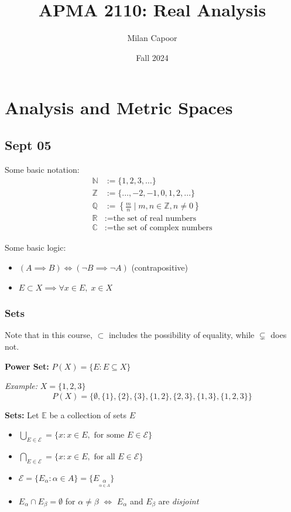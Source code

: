 \documentclass[12pt]{report}
\title{APMA 2110: Real Analysis}
\author{Milan Capoor}
\date{Fall 2024}
\newcommand{\R}{\mathbb{R}}
\newcommand{\E}{\mathbb{E}}
\newcommand{\Z}{\mathbb{Z}}
\newcommand{\N}{\mathbb{N}}
\newcommand{\Q}{\mathbb{Q}}
\newcommand{\C}{\mathbb{C}}
\newcommand{\Ec}{\mathcal{E}}
\newcommand{\sub}{\subseteq}
\begin{document}
\maketitle
\chapter{Analysis and Metric Spaces}
\section{Sept 05}
Some basic notation:
\begin{align*}
    \N &:= \{1, 2, 3, \ldots\} \\
    \Z &:= \{\ldots, -2, -1, 0, 1, 2, \ldots\} \\
    \Q &:= \left\{\frac{m}{n} \mid m, n \in \Z, n \neq 0\right\} \\
    \R &:= \text{the set of real numbers}\\
    \C &:= \text{the set of complex numbers}     
\end{align*}

Some basic logic:
\begin{itemize}
    \item $(A \implies B) \iff (\neg B \implies \neg A)$ (contrapositive)
    \item $E \subset X \implies \forall x \in E, \; x \in X$
\end{itemize}

    \subsection*{Sets}
    Note that in this course, $\subset$ includes the possibility of equality, while $\subsetneq$ does not.

    \textbf{Power Set:} $P(X) = \{E: E \sub X\}$

    \emph{Example:} $X = \{1, 2, 3\}$ 
    \[P(X) = \{\emptyset, \{1\}, \{2\}, \{3\}, \{1, 2\}, \{2, 3\}, \{1, 3\}, \{1, 2, 3\}\}\]

    \textbf{Sets:} Let $\E$ be a collection of sets $E$
    \begin{itemize}
        \item $\bigcup_{E \in \Ec} = \{x : x\in E, \text{ for some } E \in \Ec\}$
        \item $\bigcap_{E \in \Ec} = \{x : x\in E, \text{ for all } E \in \Ec\}$
        \item $\Ec = \{E_{\alpha} : \alpha \in A\} = \{E_{\underset{\alpha \in A}{\alpha}}\}$ 
        \item $E_{\alpha} \cap E_{\beta} = \emptyset$ for $\alpha \neq \beta$ $\iff$ $E_{\alpha}$ and $E_{\beta}$ are \emph{disjoint}
    \end{itemize}
\end{document}
